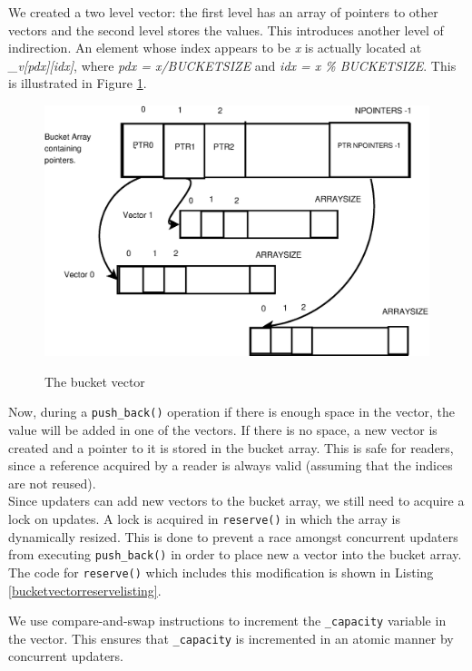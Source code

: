 \documentclass[12pt,a4paper]{article}
\begin{document}
We created a two level vector: the first level has an array of pointers to other vectors and the second level stores the values. This introduces another level of indirection. An element whose index appears to be \emph{x} is actually located at \emph{\_v[pdx][idx]}, where \emph{pdx = x/BUCKETSIZE} and \emph{idx = x \% BUCKETSIZE}. This is illustrated in Figure \ref{bucketvector}. 
\begin{figure}[tph]
\includegraphics[scale = 0.4]{../images/diagrams/bucketvector.eps}
\label{bucketvector}
\caption{The bucket vector}
\end{figure}
Now, during a \verb+push_back()+ operation if there is enough space in the vector, the value will be added in one of the vectors. If there is no space, a new vector is created and a pointer to it is stored in the bucket array. This is safe for readers, since a reference acquired by a reader is always valid (assuming that the indices are not reused).\\

Since updaters can add new vectors to the bucket array, we still need to acquire a lock on updates. A lock is acquired in \verb+reserve()+ in which the array is dynamically resized. This is done to prevent a race amongst concurrent updaters from executing \verb+push_back()+ in order to place new a vector into the bucket array. The code for \verb+reserve()+ which includes this modification is shown in Listing \ref{bucketvectorreservelisting}.

We use compare-and-swap instructions to increment the \verb+_capacity+ variable in the vector. This ensures that \verb+_capacity+ is incremented in an atomic manner by concurrent updaters.
\end{document}
